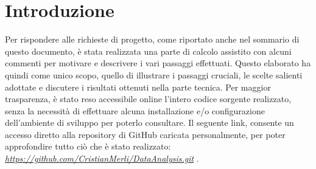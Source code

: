 \documentclass[a4paper,10pt]{article}                                                                                       %
\begin{document}
\section{Introduzione}                                                                                                      %
\label{sec:introduction}                                                                                                    %
  Per rispondere alle richieste di progetto, come riportato anche nel sommario di questo documento, è stata
  realizzata una parte di calcolo assistito con alcuni commenti per motivare e descrivere i vari passaggi effettuati.
  Questo elaborato ha quindi come unico scopo, quello di illustrare i passaggi cruciali, le scelte salienti adottate e
  discutere i risultati ottenuti nella parte tecnica. Per maggior trasparenza, è stato reso accessibile online l'intero
  codice sorgente realizzato, senza la necessità di effettuare alcuna installazione e/o configurazione dell'ambiente di
  sviluppo per poterlo consultare. Il seguente link, consente un accesso diretto alla repository di GitHub caricata
  personalmente, per poter approfondire tutto ciò che è stato realizzato:
  \textit{\href{https://github.com/CristianMerli/DataAnalysis.git}{https://github.com/CristianMerli/DataAnalysis.git}} .
\end{document}
